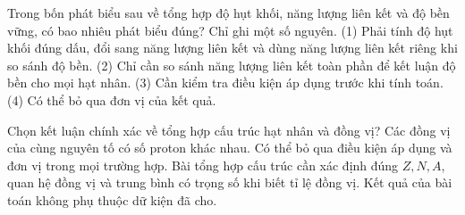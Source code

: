 \begin{ex}
Trong bốn phát biểu sau về tổng hợp độ hụt khối, năng lượng liên kết và độ bền vững, có bao nhiêu phát biểu đúng? Chỉ ghi một số nguyên. (1) Phải tính độ hụt khối đúng dấu, đổi sang năng lượng liên kết và dùng năng lượng liên kết riêng khi so sánh độ bền. (2) Chỉ cần so sánh năng lượng liên kết toàn phần để kết luận độ bền cho mọi hạt nhân. (3) Cần kiểm tra điều kiện áp dụng trước khi tính toán. (4) Có thể bỏ qua đơn vị của kết quả.
\end{ex}

\begin{ex}
Chọn kết luận chính xác về tổng hợp cấu trúc hạt nhân và đồng vị?
\choice
{Các đồng vị của cùng nguyên tố có số proton khác nhau.}
{Có thể bỏ qua điều kiện áp dụng và đơn vị trong mọi trường hợp.}
{\True Bài tổng hợp cấu trúc cần xác định đúng $Z,N,A$, quan hệ đồng vị và trung bình có trọng số khi biết tỉ lệ đồng vị.}
{Kết quả của bài toán không phụ thuộc dữ kiện đã cho.}
\end{ex}

